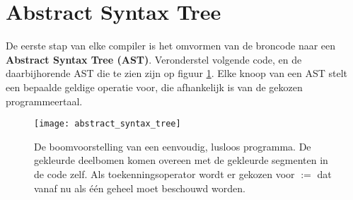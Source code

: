 \section{Abstract Syntax Tree}
De eerste stap van elke compiler is het omvormen van de broncode naar een \textbf{Abstract Syntax Tree (AST)}. Veronderstel volgende code, en de daarbijhorende AST die te zien zijn op figuur \ref{fig:abstract_syntax_tree}. Elke knoop van een AST stelt een bepaalde geldige operatie voor, die afhankelijk is van de gekozen programmeertaal.
\begin{figure}[h]
	\centering
	\texttt{[image: abstract\_syntax\_tree]}
	\caption{De boomvoorstelling van een eenvoudig, lusloos programma. De gekleurde deelbomen komen overeen met de gekleurde segmenten in de code zelf. Als toekenningsoperator wordt er gekozen voor $:=$ dat vanaf nu als één geheel moet beschouwd worden.}
	\label{fig:abstract_syntax_tree}
\end{figure}

